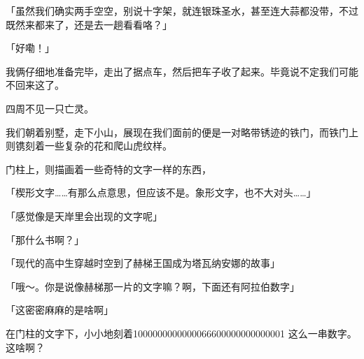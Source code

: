 「虽然我们确实两手空空，别说十字架，就连银珠圣水，甚至连大蒜都没带，不过既然来都来了，还是去一趟看看咯？」

「好嘞！」

\sqsplit

我俩仔细地准备完毕，走出了据点车，然后把车子收了起来。毕竟说不定我们可能不回来这了。

四周不见一只亡灵。

我们朝着别墅，走下小山，展现在我们面前的便是一对略带锈迹的铁门，而铁门上则镌刻着一些复杂的花和爬山虎纹样。

门柱上，则描画着一些奇特的文字一样的东西，

「楔形文字……有那么点意思，但应该不是。象形文字，也不大对头……」

「感觉像是天岸里会出现的文字呢」

「那什么书啊？」

「现代的高中生穿越时空到了赫梯王国成为塔瓦纳安娜的故事」

「哦～。你是说像赫梯那一片的文字嘛？啊，下面还有阿拉伯数字」

「这密密麻麻的是啥啊」

在门柱的文字下，小小地刻着1000000000000066600000000000001 这么一串数字。这啥啊？

